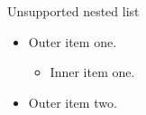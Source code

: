 \documentclass[14pt,t]{beamer-accessibility}
\begin{document}
\begin{frame}{Unsupported nested list}
\begin{itemize}
\item Outer item one.
  \begin{itemize}
  \item Inner item one.
  \end{itemize}
\item Outer item two.
\end{itemize}
\end{frame}
\end{document}
